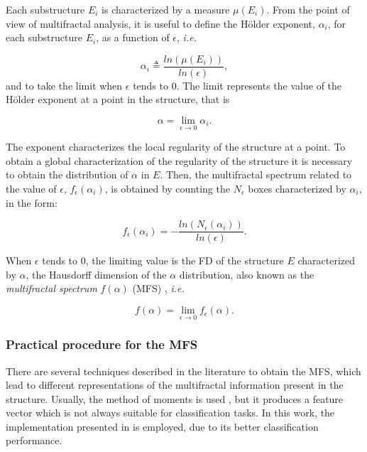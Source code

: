 Each substructure $E_{i}$ is characterized by a measure $\mu(E_{i})$. From the point of view of multifractal analysis, it is useful to define the H\"older exponent, $\alpha_{i}$, for each substructure $E_{i}$, as a function of $\epsilon$, {\em i.e.}


\begin{equation}
\alpha_{i} \triangleq \frac{ln(\mu(E_{i}))}{ln(\epsilon)},
\label{eqn:eqn4}
\end{equation}
\noindent
and to take the limit when $\epsilon$ tends to $0$. The limit represents the value of the H\"older exponent at a point in the structure, that is

\begin{equation}
\alpha = \lim_{\epsilon\to0}{\alpha_{i}}.
\label{eqn:eqn5}
\end{equation}

The exponent characterizes the local regularity of the structure at a point. To obtain a global characterization of the regularity of the structure it is necessary to obtain the distribution of $\alpha$ in $E$. Then, the multifractal spectrum related to the value of $\epsilon$, $f_{\epsilon}(\alpha_{i})$, is obtained by counting the $N_{\epsilon}$ boxes characterized by $\alpha_{i}$, in the form:

\begin{equation}
f_{\epsilon}(\alpha_{i}) = - \frac{ln(N_{\epsilon}(\alpha_{i}))}{ln(\epsilon)}.
\label{eqn:eqn6}
\end{equation}

When $\epsilon$ tends to $0$, the limiting value is the FD of the structure $E$ characterized by $\alpha$, the Hausdorff dimension of the $\alpha$ distribution, also known as the {\em multifractal spectrum} $f(\alpha)$ (MFS) \cite{Silvetti2010}, {\em i.e.}

\begin{equation}
f(\alpha) = \lim_{\epsilon\to0}{f_{\epsilon}(\alpha)}.
\label{eqn:eqn7}
\end{equation}

\subsubsection{Practical procedure for the MFS}
There are several techniques described in the literature to obtain the MFS, which lead to different representations of the multifractal information present in the structure. Usually, the method of moments is used \cite{Mendoza2010,Serrano2012}, but it produces a feature vector which is not always suitable for classification tasks. In this work, the implementation presented in \cite{Xu2009} is employed, due to its better classification performance.


